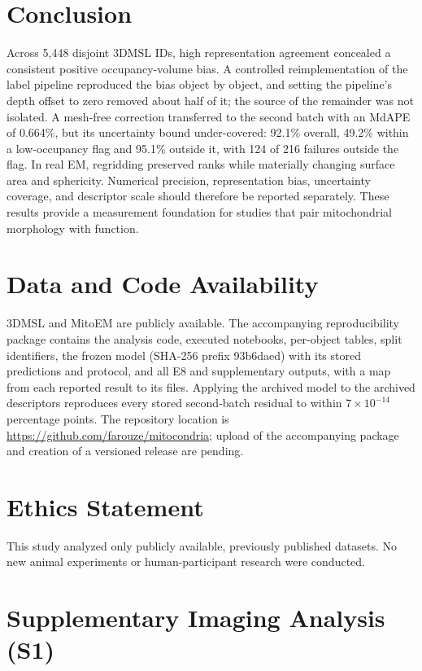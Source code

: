 \documentclass[journal]{IEEEtran}
\newcommand{\repourl}{https://github.com/farouze/mitocondria}
\begin{document}
\section{Conclusion}

Across 5,448 disjoint 3DMSL IDs, high representation agreement concealed a consistent positive occupancy-volume bias. A controlled reimplementation of the label pipeline reproduced the bias object by object, and setting the pipeline's depth offset to zero removed about half of it; the source of the remainder was not isolated. A mesh-free correction transferred to the second batch with an MdAPE of 0.664\%, but its uncertainty bound under-covered: 92.1\% overall, 49.2\% within a low-occupancy flag and 95.1\% outside it, with 124 of 216 failures outside the flag. In real EM, regridding preserved ranks while materially changing surface area and sphericity. Numerical precision, representation bias, uncertainty coverage, and descriptor scale should therefore be reported separately. These results provide a measurement foundation for studies that pair mitochondrial morphology with function.

\section*{Data and Code Availability}

3DMSL \cite{ref12} and MitoEM \cite{ref15} are publicly available. The accompanying reproducibility package contains the analysis code, executed notebooks, per-object tables, split identifiers, the frozen model (SHA-256 prefix 93b6daed) with its stored predictions and protocol, and all E8 and supplementary outputs, with a map from each reported result to its files. Applying the archived model to the archived descriptors reproduces every stored second-batch residual to within $7\times10^{-14}$ percentage points. The repository location is \url{\repourl}; upload of the accompanying package and creation of a versioned release are pending.

\section*{Ethics Statement}

This study analyzed only publicly available, previously published datasets. No new animal experiments or human-participant research were conducted.


\appendices
\section{Supplementary Imaging Analysis (S1)}
\end{document}
